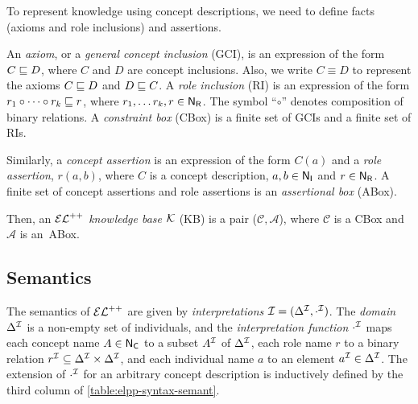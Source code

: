 To represent knowledge using concept descriptions, we need to define facts (axioms and role inclusions) and assertions.

An \emph{axiom}, or a \emph{general concept inclusion} (GCI), is an expression of the form $C \sqsubseteq D$, where $C$ and $D$ are concept inclusions. Also, we write $C \equiv D$ to represent the axioms $C \sqsubseteq D$ and $D \sqsubseteq C$. A \emph{role inclusion} (RI) is an expression of the form $r_1 \circ \cdots \circ r_k \sqsubseteq r$, where $r_1, \dots r_k, r \in \mathsf{N_R}$.  The symbol ``$\circ$'' denotes composition of binary relations. A \emph{constraint box} (CBox) is a finite set of GCIs and a finite set of RIs.

Similarly, a \emph{concept assertion} is an expression of the form $C(a)$ and a \emph{role assertion}, $r(a, b)$, where $C$ is a concept description, $a, b \in \mathsf{N_I}$ and $r \in \mathsf{N_R}$. A finite set of concept assertions and role assertions is an \emph{assertional box} (ABox).

Then, an $\mathcal{EL}^{++}$ \emph{knowledge base} $\mathcal{K}$ (KB) is a pair ($\mathcal{C}, \mathcal{A}$), where $\mathcal{C}$ is a CBox and $\mathcal{A}$ is an~ABox.

\subsection{Semantics}
The semantics of $\mathcal{EL}^{++}$ are given by \emph{interpretations} $\mathcal{I} = (\Delta^{\mathcal{I}}, \cdot^{\mathcal{I}})$. The \emph{domain} $\Delta^{\mathcal{I}}$ is a non-empty set of individuals, and the \emph{interpretation function} $\cdot^{\mathcal{I}}$ maps each concept name $A \in \mathsf{N_C}$ to a subset $A^{\mathcal{I}}$ of $\Delta^{\mathcal{I}}$, each role name $r$ to a binary relation $r^{\mathcal{I}} \subseteq \Delta^{\mathcal{I}} \times \Delta^{\mathcal{I}}$, and each individual name $a$ to an element $a^{\mathcal{I}} \in \Delta^{\mathcal{I}}$. The extension of $\cdot^{\mathcal{I}}$ for an arbitrary concept description is inductively defined by the third column of \autoref{table:elpp-syntax-semant}.

